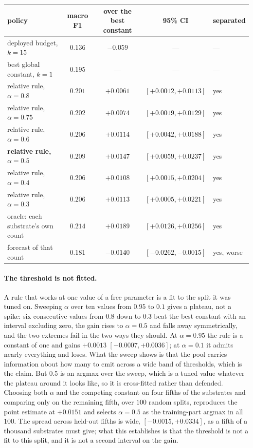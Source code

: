 \begin{center}\small
\begin{tabular}{lcccl}
\toprule
policy & macro F1 & over the best constant & 95\% CI & separated \\
\midrule
deployed budget, $k=15$        & $0.136$ & $-0.059$ & --- & --- \\
best global constant, $k=1$    & $0.195$ & --- & --- & --- \\
\midrule
relative rule, $\alpha=0.8$    & $0.201$ & $+0.0061$ & $[+0.0012,+0.0113]$ & yes \\
relative rule, $\alpha=0.75$   & $0.202$ & $+0.0074$ & $[+0.0019,+0.0129]$ & yes \\
relative rule, $\alpha=0.6$    & $0.206$ & $+0.0114$ & $[+0.0042,+0.0188]$ & yes \\
\textbf{relative rule, $\alpha=0.5$} & $\mathbf{0.209}$ & $\mathbf{+0.0147}$ & $[+0.0059,+0.0237]$ & yes \\
relative rule, $\alpha=0.4$    & $0.206$ & $+0.0108$ & $[+0.0015,+0.0204]$ & yes \\
relative rule, $\alpha=0.3$    & $0.206$ & $+0.0113$ & $[+0.0005,+0.0221]$ & yes \\
\midrule
oracle: each substrate's own count & $0.214$ & $+0.0189$ & $[+0.0126,+0.0256]$ & yes \\
forecast of that count             & $0.181$ & $-0.0140$ & $[-0.0262,-0.0015]$ & yes, worse \\
\bottomrule
\end{tabular}
\end{center}

\paragraph{The threshold is not fitted.} A rule that works at one value of a free parameter is a fit
to the split it was tuned on. Sweeping $\alpha$ over ten values from $0.95$ to $0.1$ gives a
plateau, not a spike: six consecutive values from $0.8$ down to $0.3$ beat the best constant with an
interval excluding zero, the gain rises to $\alpha=0.5$ and falls away symmetrically, and the two
extremes fail in the two ways they should. At $\alpha=0.95$ the rule is a constant of one and gains
$+0.0013$ $[-0.0007,+0.0036]$; at $\alpha=0.1$ it admits nearly everything and loses. What the
sweep shows is that the pool carries information about how many to emit across a wide band of
thresholds, which is the claim. But $0.5$ is an argmax over the sweep, which is a
tuned value whatever the plateau around it looks like, so it is cross-fitted rather than defended.
Choosing both $\alpha$ and the competing constant on four fifths of the substrates and comparing
only on the remaining fifth, over $100$ random splits, reproduces the point estimate at $+0.0151$
and selects $\alpha=0.5$ as the training-part argmax in all $100$. The spread across held-out fifths
is wide, $[-0.0015,+0.0334]$, as a fifth of a thousand substrates must give; what this establishes
is that the threshold is not a fit to this split, and it is not a second interval on the gain.

